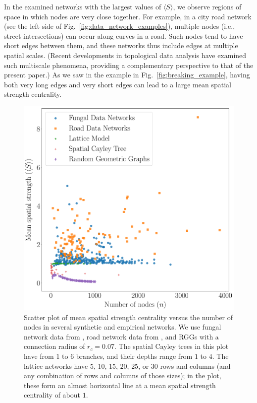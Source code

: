 \documentclass[%
 reprint,
 amsmath,amssymb,
 aps,
]{revtex4-1}
\begin{document}
In the examined networks with the largest values of $\langle S \rangle$, we observe regions of space in which nodes are very close together.
For example, in a city road network (see the left side of Fig.~\ref{fig:data_network_examples}), multiple nodes (i.e., street intersections) can occur along curves in a road. Such nodes tend to have short edges between them, and these networks thus include edges at multiple spatial scales. (Recent developments in topological data analysis \cite{feng2019,feng2020} have examined such multiscale phenomena, providing a complementary perspective to that of the present paper.) As we saw in the example in Fig.~\ref{fig:breaking_example}, having both very long edges and very short edges can lead to a large mean spatial strength centrality.


\begin{figure}
    \centering
    \includegraphics[width=1.0\linewidth]{spatial_scatter_1.pdf}
    \caption{Scatter plot of mean spatial strength centrality versus the number of nodes in several synthetic and empirical networks. We use fungal network data from \cite{fungal_data}, road network data from \cite{road_data}, and RGGs with a connection radius of $r_c = 0.07$. The spatial Cayley trees in this plot have from $1$ to $6$ branches, and their depths range from $1$ to $4$. The lattice networks have $5$, $10$, $15$, $20$, $25$, or $30$ rows and columns (and any combination of rows and columns of those sizes); in the plot, these form an almost horizontal line at a mean spatial strength centrality of about $1$.
    }
    \label{fig:spatial_distributions}
\end{figure}
\end{document}
